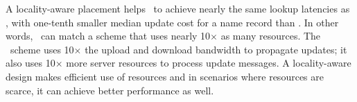 









A locality-aware placement helps \auspice\ to achieve nearly the same lookup latencies as \replicateall, with one-tenth smaller median update cost for a name record than \replicateall. In other words, \auspice\ can match a scheme that uses nearly 10$\times$ as many resources. The \replicateall\ scheme uses 10$\times$ the upload and download bandwidth to propagate updates; it also uses 10$\times$ more server resources to process update messages. A locality-aware design makes efficient use of resources and in scenarios where resources are scarce, it can achieve better performance as well.

